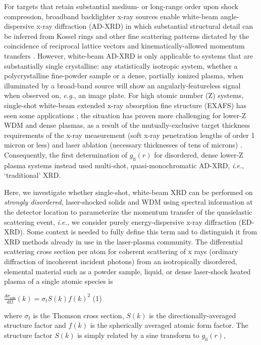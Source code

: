 For targets that retain substantial medium- or long-range order upon
shock compression, broadband backlighter x-ray sources enable white-beam
angle-dispersive x-ray diffraction (AD-XRD) in which substantial
structural detail can be inferred from Kossel rings
 \cite{LIDER2011X}
and other fine scattering patterns dictated by the coincidence of
reciprocal lattice vectors and kinematically-allowed momentum transfers
 \cite{SUGGIT2010NANOSECOND}.
However, white-beam AD-XRD is only applicable to systems that are
substantially single crystalline: any statistically isotropic system,
whether a polycrystalline fine-powder sample or a dense, partially
ionized plasma, when illuminated by a broad-band source will show an
angularly-featureless signal when observed on, \emph{e.g}., an image
plate. For high atomic number (Z) systems, single-shot white-beam
extended x-ray absorption fine structure (EXAFS) has seen some
applications
 \cite{yaakobi2005exafs};
the situation has proven more challenging for lower-Z WDM and dense
plasmas, as a result of the mutually-exclusive target thickness
requirements of the x-ray measurement (soft x-ray penetration lengths of
order 1 micron or less) and laser ablation (necessary thicknesses of
tens of microns)
 \cite{BOURGADE2004NEW}.
Consequently, the first determination of
\(g_{\text{ii}}\left( r \right)\) for disordered, dense lower-Z plasma
systems
 \cite{ma2013x}
instead used multi-shot, quasi-monochromatic AD-XRD, \emph{i.e.},
`traditional' XRD.

Here, we investigate whether single-shot, white-beam XRD can be
performed on \emph{strongly disordered}, laser-shocked solids and WDM
using spectral information at the detector location to parameterize the
momentum transfer of the quasielastic scattering event, \emph{i.e.,} we
consider purely energy-dispersive x-ray diffraction (ED-XRD). Some
context is needed to fully define this term and to distinguish it from
XRD methods already in use in the laser-plasma community. The
differential scattering cross section per atom for coherent scattering
of x rays (ordinary diffraction of incoherent incident photons) from an
isotropically disordered, elemental material such as a powder sample,
liquid, or dense laser-shock heated plasma of a single atomic species is

\(\frac{d\sigma_{\text{coh}}}{\text{dΩ}}\left( k \right) = \sigma_{t}S\left( k \right){f\left( k \right)}^{2}\)
(1)

where \(\sigma_{t}\) is the Thomson cross section, \(S(k)\) is the
directionally-averaged structure factor and \(f\left( k \right)\) is the
spherically averaged atomic form factor. The structure factor \(S(k)\)
is simply related by a sine transform to
\(g_{\text{ii}}\left( r \right)\),

